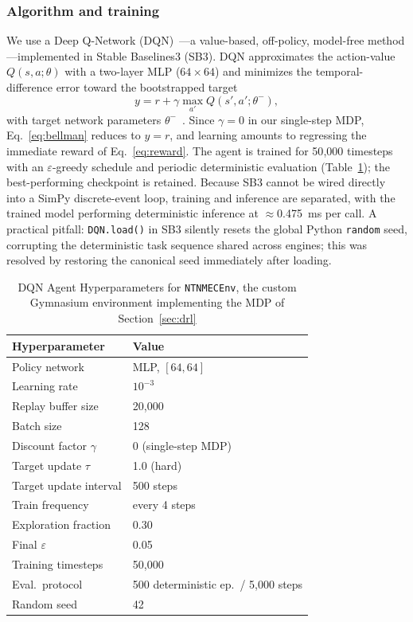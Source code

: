 \documentclass[conference,comsoc,twoside,caption=false]{IEEEtran}
\let\MYoriglatexcaption\caption
\renewcommand{\caption}[2][\relax]{\MYoriglatexcaption[#2]{#2}}
\theoremstyle{definition}
\begin{document}
\subsubsection*{Algorithm and training}
We use a Deep Q-Network (DQN)~\cite{mnih2015}---a value-based, off-policy,
model-free method---implemented in Stable Baselines3 (SB3). DQN approximates the
action-value $Q(s,a;\theta)$ with a two-layer \ac{MLP} ($64\times64$) and minimizes
the temporal-difference error toward the bootstrapped target
\begin{equation}
y = r + \gamma \max_{a'} Q(s',a';\theta^{-}),
\label{eq:bellman}
\end{equation}
with target network parameters $\theta^{-}$~\cite{sutton2018,mnih2015}. Since
$\gamma = 0$ in our single-step MDP, Eq.~\eqref{eq:bellman} reduces to
$y = r$, and learning amounts to regressing the immediate reward of
Eq.~\eqref{eq:reward}. The agent is trained for 50{,}000 timesteps with an
$\varepsilon$-greedy schedule and periodic deterministic evaluation
(Table~\ref{tab:dqn}); the best-performing checkpoint is retained. Because SB3
cannot be wired directly into a SimPy discrete-event loop, training and
inference are separated, with the trained model performing deterministic
inference at $\approx$0.475~ms per call. A practical pitfall: \texttt{DQN.load()}
in SB3 silently resets the global Python \texttt{random} seed, corrupting the
deterministic task sequence shared across engines; this was resolved by
restoring the canonical seed immediately after loading.

\begin{table}[!t]
\centering
\caption{DQN Agent Hyperparameters for \texttt{NTNMECEnv}, the custom
Gymnasium environment implementing the MDP of Section~\ref{sec:drl}}
\label{tab:dqn}
\footnotesize
\begin{tabular}{p{4.3cm}p{3.3cm}}
\toprule
\textbf{Hyperparameter} & \textbf{Value} \\
\midrule
Policy network        & MLP, $[64, 64]$ \\
Learning rate         & $10^{-3}$ \\
Replay buffer size    & 20{,}000 \\
Batch size            & 128 \\
Discount factor $\gamma$ & 0 (single-step MDP) \\
Target update $\tau$  & 1.0 (hard) \\
Target update interval & 500 steps \\
Train frequency       & every 4 steps \\
Exploration fraction  & 0.30 \\
Final $\varepsilon$   & 0.05 \\
Training timesteps    & 50{,}000 \\
Eval.\ protocol       & 500 deterministic ep.\ / 5{,}000 steps \\
Random seed           & 42 \\
\bottomrule
\end{tabular}
\end{table}
\end{document}
